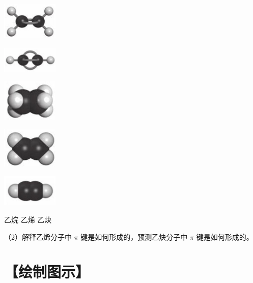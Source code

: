 \documentclass[10pt]{article}
\begin{document}
\begin{center}
\includegraphics[max width=0.2\textwidth]{images/0190e026-5a11-7df7-bd27-54d09026ba7a_39_140608.jpg}
\end{center}

\begin{center}
\includegraphics[max width=0.2\textwidth]{images/0190e026-5a11-7df7-bd27-54d09026ba7a_39_503101.jpg}
\end{center}

\begin{center}
\includegraphics[max width=0.2\textwidth]{images/0190e026-5a11-7df7-bd27-54d09026ba7a_39_620247.jpg}
\end{center}

\begin{center}
\includegraphics[max width=0.2\textwidth]{images/0190e026-5a11-7df7-bd27-54d09026ba7a_39_605859.jpg}
\end{center}

\begin{center}
\includegraphics[max width=0.2\textwidth]{images/0190e026-5a11-7df7-bd27-54d09026ba7a_39_980722.jpg}
\end{center}

乙烷 乙烯 乙炔

（2）解释乙烯分子中 \(\pi\) 键是如何形成的，预测乙炔分子中 \(\pi\) 键是如何形成的。

\section*{【绘制图示】}
\end{document}
